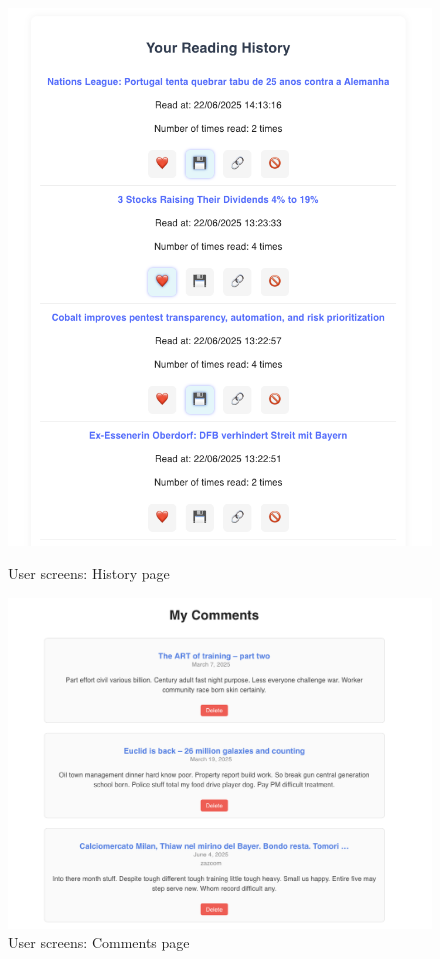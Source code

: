 \begin{figure}[!h]
    \centering
    \begin{minipage}{0.48\linewidth}
        \centering
        \includegraphics[width=1\textwidth]{chapters/chapter_03/page/user/history-page}
        \caption{User screens: History page}
        \label{fig:history-wireframes}
    \end{minipage}
    \hfil
    \begin{minipage}{0.48\linewidth}
        \centering
        \includegraphics[width=1\textwidth]{chapters/chapter_03/page/user/comments-page}
        \caption{User screens: Comments page}
        \label{fig:comments-wireframes}
    \end{minipage}
\end{figure}




